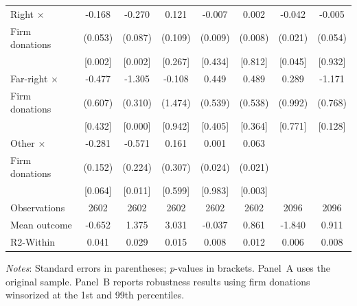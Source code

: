 \documentclass[12pt,a4paper]{article}
\begin{document}
\begin{landscape}
\begin{table}[!htbp]
{\begin{tabular}{l*{7}{c}}
Right $\times$
                & -0.168 & -0.270 & 0.121 & -0.007 & 0.002 & -0.042 & -0.005 \\
Firm donations
                & (0.053) & (0.087) & (0.109) & (0.009) & (0.008) & (0.021) & (0.054) \\
                & [0.002] & [0.002] & [0.267] & [0.434] & [0.812] & [0.045] & [0.932] \\

Far-right $\times$
                & -0.477 & -1.305 & -0.108 & 0.449 & 0.489 & 0.289 & -1.171 \\
Firm donations
                & (0.607) & (0.310) & (1.474) & (0.539) & (0.538) & (0.992) & (0.768) \\
                & [0.432] & [0.000] & [0.942] & [0.405] & [0.364] & [0.771] & [0.128] \\

Other $\times$
                & -0.281 & -0.571 & 0.161 & 0.001 & 0.063 &   &   \\
Firm donations
                & (0.152) & (0.224) & (0.307) & (0.024) & (0.021) &   &   \\
                & [0.064] & [0.011] & [0.599] & [0.983] & [0.003] &   &   \\
\hline
Observations    & 2602 & 2602 & 2602 & 2602 & 2602 & 2096 & 2096 \\
Mean outcome    & -0.652 & 1.375 & 3.031 & -0.037 & 0.861 & -1.840 & 0.911 \\
R2-Within       & 0.041 & 0.029 & 0.015 & 0.008 & 0.012 & 0.006 & 0.008 \\
\hline\hline
\end{tabular}
}

\vspace{1mm}
\begin{flushleft}
\footnotesize
\justifying
\textit{Notes}: Standard errors in parentheses; \textit{p}-values in brackets.  
Panel~A uses the original sample.  
Panel~B reports robustness results using firm donations winsorized at the 1st and 99th percentiles.
\end{flushleft}
\end{table}
\end{landscape}
\end{document}
